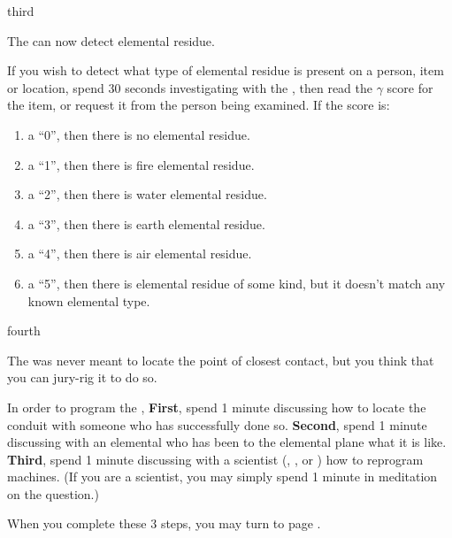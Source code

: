 \documentclass[notebook]{elementals}
\begin{document}
\begin{page}{third}

The \iTricorder{} can now detect elemental residue.

If you wish to detect what type of elemental residue is present on a person, item or location, spend 30 seconds investigating with the \iTricorder{}, then read the $\gamma$ score for the item, or request it from the person being examined. If the score is:

\begin{enumerate}
  \item a ``0'', then there is no elemental residue.
  \item a ``1'', then there is fire elemental residue.
  \item a ``2'', then there is water elemental residue.
  \item a ``3'', then there is earth elemental residue.
  \item a ``4'', then there is air elemental residue.
  \item a ``5'', then there is elemental residue of some kind, but it doesn't match any known elemental type.
\end{enumerate}

\end{page}

\begin{page}{fourth}

The \iTricorder{} was never meant to locate the point of closest contact, but you think that you can jury-rig it to do so.

In order to program the \iTricorder{}, {\bf First}, spend 1 minute discussing how to locate the conduit with someone who has successfully done so. {\bf Second}, spend 1 minute discussing with an elemental who has been to the elemental plane what it is like. {\bf Third}, spend 1 minute discussing with a scientist (\cGD{}, \cScientist{}, or \cMS{}) how to reprogram machines. (If you are a scientist, you may simply spend 1 minute in meditation on the question.)

When you complete these 3 steps, you may turn to page .

\end{page}
\end{document}
